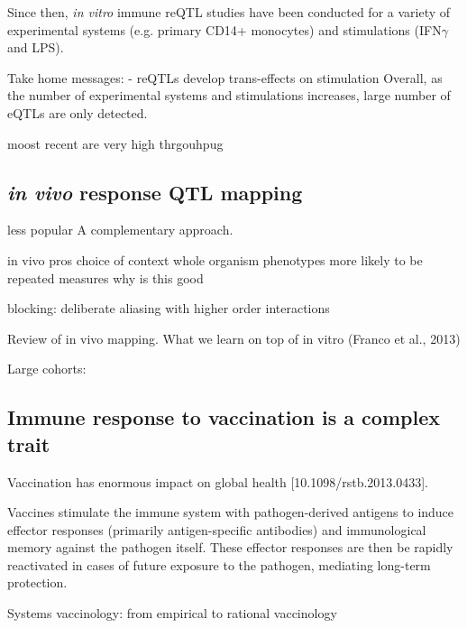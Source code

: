 \begin{outline}

Since then, \textit{in vitro} immune reQTL studies have been conducted for a variety of experimental systems (e.g. primary CD14+ monocytes\autocite{fairfax2014InnateImmuneActivity}) and stimulations (IFN$\gamma$ and LPS\autocite{fairfax2014GeneticsGeneExpression}).

Take home messages:
- reQTLs develop trans-effects on stimulation \autocite{fairfax2014InnateImmuneActivity}
Overall, as the number of experimental systems and stimulations increases, large number of eQTLs are only detected.

moost recent are very high thrgouhpug

\subsection{\textit{in vivo} response QTL mapping}

less popular
A complementary approach.

in vivo pros
    choice of context 
    whole organism phenotypes
    more likely to be repeated measures
        why is this good

        blocking: deliberate aliasing with higher order interactions

Review of in vivo mapping.
What we learn on top of in vitro
(Franco et al., 2013)

Large cohorts: 

\subsection{Immune response to vaccination is a complex trait}

Vaccination has enormous impact on global health [10.1098/rstb.2013.0433].

Vaccines stimulate the immune system with pathogen-derived antigens to induce effector responses (primarily antigen-specific antibodies) and immunological memory against the pathogen itself.
These effector responses are then be rapidly reactivated in cases of future exposure to the pathogen, mediating long-term protection.

Systems vaccinology: from empirical to rational vaccinology


\end{outline}
